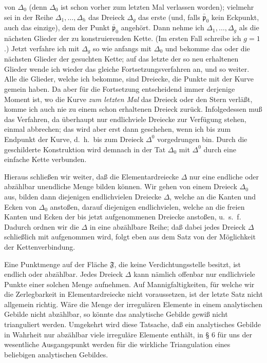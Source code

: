 \documentclass{article}
\begin{document}
von $\Delta_0$ (denn $\Delta_0$ ist schon vorher zum letzten Mal verlassen worden); vielmehr sei in der Reihe $\Delta_1, \dots, \Delta_h$ das Dreieck $\Delta_g$ das erste (und, falls $\bar{\mathfrak{p}}_0$ kein Eckpunkt, auch das einzige), dem der Punkt $\bar{\mathfrak{p}}_0$ angehört. Dann nehme ich $\Delta_1, \dots, \Delta_g$ als die nächsten Glieder der zu konstruierenden Kette. (Im ersten Fall schreibe ich $g = 1$.) Jetzt verfahre ich mit $\Delta_g$ so wie anfangs mit $\Delta_0$ und bekomme das oder die nächsten Glieder der gesuchten Kette; auf das letzte der so neu erhaltenen Glieder wende ich wieder das gleiche Fortsetzungsverfahren an, und so weiter. Alle die Glieder, welche ich bekomme, sind Dreiecke, die Punkte mit der Kurve gemein haben. Da aber für die Fortsetzung entscheidend immer derjenige Moment ist, wo die Kurve \emph{zum letzten Mal} das Dreieck oder den Stern verläßt, komme ich auch nie zu einem schon erhaltenen Dreieck zurück. Infolgedessen muß das Verfahren, da überhaupt nur endlichviele Dreiecke zur Verfügung stehen, einmal abbrechen; das wird aber erst dann geschehen, wenn ich bis zum Endpunkt der Kurve, d.\ h.\ bis zum Dreieck $\Delta^0$ vorgedrungen bin. Durch die geschilderte Konstruktion wird demnach in der Tat $\Delta_0$ mit $\Delta^0$ durch eine einfache Kette verbunden.

Hieraus schließen wir weiter, daß die Elementardreiecke $\Delta$ nur eine endliche oder abzählbar unendliche Menge bilden können. Wir gehen von einem Dreieck $\Delta_0$ aus, bilden dann diejenigen endlichvielen Dreiecke $\Delta$, welche an die Kanten und Ecken von $\Delta_0$ anstoßen, darauf diejenigen endlichvielen, welche an die freien Kanten und Ecken der bis jetzt aufgenommenen Dreiecke anstoßen, u.\ s.\ f. Dadurch ordnen wir die $\Delta$ in eine abzählbare Reihe; daß dabei jedes Dreieck $\Delta$ schließlich mit aufgenommen wird, folgt eben aus dem Satz von der Möglichkeit der Kettenverbindung.

Eine Punktmenge auf der Fläche $\mathfrak{F}$, die keine Verdichtungsstelle besitzt, ist endlich oder abzählbar. Jedes Dreieck $\Delta$ kann nämlich offenbar nur endlichviele Punkte einer solchen Menge aufnehmen. Auf Mannigfaltigkeiten, für welche wir die Zerlegbarkeit in Elementardreiecke nicht voraussetzen, ist der letzte Satz nicht allgemein richtig. Wäre die Menge der irregulären Elemente in einem analytischen Gebilde nicht abzählbar, so könnte das analytische Gebilde gewiß nicht trianguliert werden. Umgekehrt wird diese Tatsache, daß ein analytisches Gebilde in Wahrheit nur abzählbar viele irreguläre Elemente enthält, in § 6 für uns der wesentliche Ausgangspunkt werden für die wirkliche Triangulation eines beliebigen analytischen Gebildes.
\end{document}
